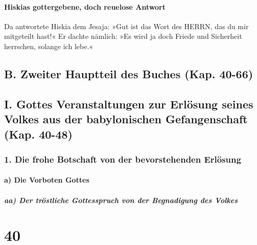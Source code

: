 \hypertarget{hiskias-gottergebene-doch-reuelose-antwort}{%
\paragraph{Hiskias gottergebene, doch reuelose
Antwort}\label{hiskias-gottergebene-doch-reuelose-antwort}}

Da antwortete Hiskia dem Jesaja: »Gut ist das Wort des
HERRN, das du mir mitgeteilt hast!« Er dachte nämlich: »Es wird ja doch
Friede und Sicherheit herrschen, solange ich lebe.«

\hypertarget{b.-zweiter-hauptteil-des-buches-kap.-40-66}{%
\subsection{B. Zweiter Hauptteil des Buches (Kap.
40-66)}\label{b.-zweiter-hauptteil-des-buches-kap.-40-66}}

\hypertarget{i.-gottes-veranstaltungen-zur-erluxf6sung-seines-volkes-aus-der-babylonischen-gefangenschaft-kap.-40-48}{%
\subsection{I. Gottes Veranstaltungen zur Erlösung seines Volkes aus der
babylonischen Gefangenschaft (Kap.
40-48)}\label{i.-gottes-veranstaltungen-zur-erluxf6sung-seines-volkes-aus-der-babylonischen-gefangenschaft-kap.-40-48}}

\hypertarget{die-frohe-botschaft-von-der-bevorstehenden-erluxf6sung}{%
\subsubsection{1. Die frohe Botschaft von der bevorstehenden
Erlösung}\label{die-frohe-botschaft-von-der-bevorstehenden-erluxf6sung}}

\hypertarget{a-die-vorboten-gottes}{%
\paragraph{a) Die Vorboten Gottes}\label{a-die-vorboten-gottes}}

\hypertarget{aa-der-truxf6stliche-gottesspruch-von-der-begnadigung-des-volkes}{%
\subparagraph{aa) Der tröstliche Gottesspruch von der Begnadigung des
Volkes}\label{aa-der-truxf6stliche-gottesspruch-von-der-begnadigung-des-volkes}}

\hypertarget{section-39}{%
\section{40}\label{section-39}}

